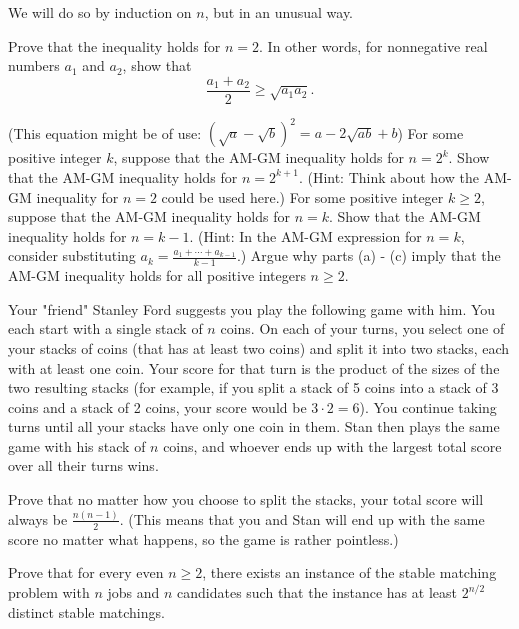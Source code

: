\documentclass[11pt]{article}
\begin{document}
We will do so by induction on $n$, but in an unusual way.
\begin{Parts}
\Part Prove that the inequality holds for $n = 2$. In other words, for nonnegative real numbers $a_1$ and $a_2$, show that
\[\frac{a_1 + a_2}{2} \geq \sqrt{a_1a_2}.\]

(This equation might be of use: $(\sqrt{a} - \sqrt{b})^2 = a - 2 \sqrt{ab} + b$)
\Part For some positive integer $k$, suppose that the AM-GM inequality holds for $n = 2^k$. Show that the AM-GM inequality holds for $n = 2^{k+1}$. (Hint: Think
about how the AM-GM inequality for $n = 2$ could be used here.)
\Part For some positive integer $k \geq 2$, suppose that the AM-GM inequality holds for $n = k$. Show that the AM-GM inequality holds for $n = k - 1$. (Hint: In the AM-GM
expression for $n = k$, consider substituting $a_k = \frac{a_1 + \cdots + a_{k-1}}{k-1}$.)
\Part Argue why parts (a) - (c) imply that the AM-GM inequality holds for all positive integers $n \geq 2$.
\end{Parts}


Your "friend" Stanley Ford suggests you play the following game with him.  You each start with a single stack of $n$ coins.  On each of your turns, you select one of your stacks of coins (that has at least two coins) and split it into two stacks, each with at least one coin.  Your score for that turn is the product of the sizes of the two resulting stacks (for example, if you split a stack of 5 coins into a stack of 3 coins and a stack of 2 coins, your score would be $3 \cdot 2 = 6$).  You continue taking turns until all your stacks have only one coin in them.  Stan then plays the same game with his stack of $n$ coins, and whoever ends up with the largest total score over all their turns wins.

Prove that no matter how you choose to split the stacks, your total score will always be $\frac{n(n - 1)}{2}$. (This means that you and Stan will end up with the same score no matter what happens, so the game is rather pointless.)


Prove that for every even $n \geq 2$, there exists an instance of the stable matching problem with $n$ jobs and $n$ candidates such that the instance has at least $2^{n/2}$ distinct stable matchings.
\end{document}
